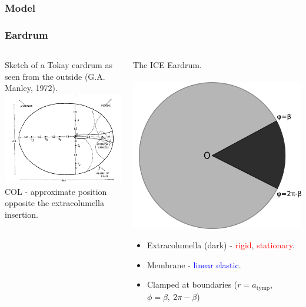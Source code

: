 \documentclass{beamer}
\begin{document}
\subsubsection{Model}
\begin{frame}[t]
\frametitle{Eardrum}
\begin{columns}
    \begin{column}{0.5\textwidth}
      \centering
      \small
      Sketch of a Tokay eardrum as seen from the outside (G.A. Manley, 1972).\\
      \includegraphics[width = 3.7 cm]{Diagrams/geckoear.png}\\
      \small
     COL - approximate position opposite the extracolumella insertion.
    \end{column}

    \begin{column}{0.5\textwidth}
      \centering
      \small
      The ICE Eardrum.\\
      \textbf{}\\
      \includegraphics[width = 3.2 cm]{Diagrams/tympanummodel.png}\\
\small
\begin{itemize}
      \item[] Extracolumella (dark) - \textcolor{red}{rigid}, \textcolor{red}{stationary}.
      \item[] Membrane - \textcolor{blue}{linear elastic}.
      \item[] Clamped at boundaries ($r=a_{\mathrm{tymp}}$, $\phi=\beta,\ 2\pi-\beta$)
\end{itemize}

    \end{column}
  \end{columns}
  
\end{frame}
\end{document}
